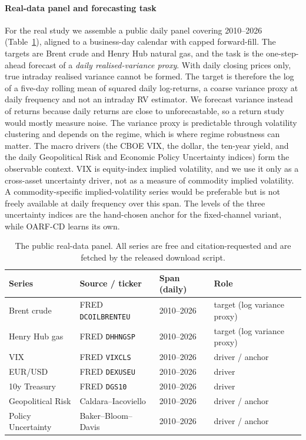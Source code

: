 \documentclass[authoryear,preprint,12pt]{elsarticle}
\theoremstyle{plain}
\theoremstyle{remark}
\newcommand{\OARFCD}{\textsc{OARF-CD}}
\begin{document}
\paragraph{Real-data panel and forecasting task}
For the real study we assemble a public daily panel covering 2010--2026
(Table~\ref{tab:realdata}), aligned to a business-day calendar with capped
forward-fill. The targets are Brent crude and Henry Hub natural gas, and the task is
the one-step-ahead forecast of a \emph{daily realised-variance proxy}. With daily
closing prices only, true intraday realised variance cannot be formed. The target is
therefore the log of a five-day rolling mean of squared daily log-returns, a coarse
variance proxy at daily frequency and not an intraday RV estimator. We forecast
variance instead of returns because daily returns are close to unforecastable, so a
return study would mostly measure noise. The variance proxy is predictable through
volatility clustering and depends on the regime, which is where regime robustness can
matter. The macro drivers (the CBOE VIX, the dollar, the ten-year yield, and the daily
Geopolitical Risk and Economic Policy Uncertainty indices) form the observable context.
VIX is equity-index implied volatility, and we use it only as a cross-asset
uncertainty driver, not as a measure of commodity implied volatility. A
commodity-specific implied-volatility series would be preferable but is not freely
available at daily frequency over this span. The levels of the three uncertainty
indices are the hand-chosen anchor for the fixed-channel variant, while \OARFCD{}
learns its own.

\begin{table}[htbp]
\centering
\caption{The public real-data panel. All series are free and citation-requested and are
fetched by the released download script.}
\label{tab:realdata}
\small
\begin{tabular}{llll}
\toprule
Series & Source / ticker & Span (daily) & Role\\
\midrule
Brent crude & FRED \texttt{DCOILBRENTEU} & 2010--2026 & target (log variance proxy)\\
Henry Hub gas & FRED \texttt{DHHNGSP} & 2010--2026 & target (log variance proxy)\\
VIX & FRED \texttt{VIXCLS} & 2010--2026 & driver / anchor\\
EUR/USD & FRED \texttt{DEXUSEU} & 2010--2026 & driver\\
10y Treasury & FRED \texttt{DGS10} & 2010--2026 & driver\\
Geopolitical Risk & Caldara--Iacoviello \citep{caldara2022gpr} & 2010--2026 & driver / anchor\\
Policy Uncertainty & Baker--Bloom--Davis \citep{baker2016epu} & 2010--2026 & driver / anchor\\
\bottomrule
\end{tabular}
\end{table}
\end{document}
